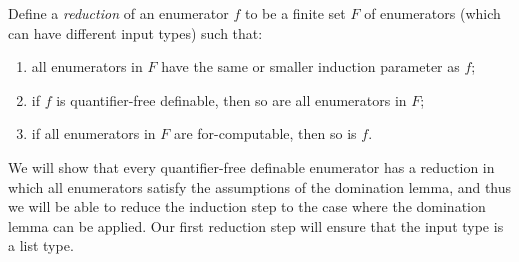 \begin{definition}[Reduction]
        Define a \emph{reduction} of an enumerator $f$ to be a finite set $F$ of enumerators (which can have different input types)  such that: 
        \begin{enumerate}
                        \item all enumerators in $F$ have the same or smaller induction parameter as $f$; 
            \item if $f$ is quantifier-free definable, then so are all enumerators in $F$;
            \item if all enumerators in $F$ are for-computable, then so is $f$.
        \end{enumerate}
\end{definition}

We will show that every quantifier-free definable enumerator has a reduction in which all enumerators satisfy the assumptions of the domination lemma, and thus we will be able to reduce the induction step to the case where the domination lemma can be applied.
Our first reduction step will ensure that the input type is a list type. 

